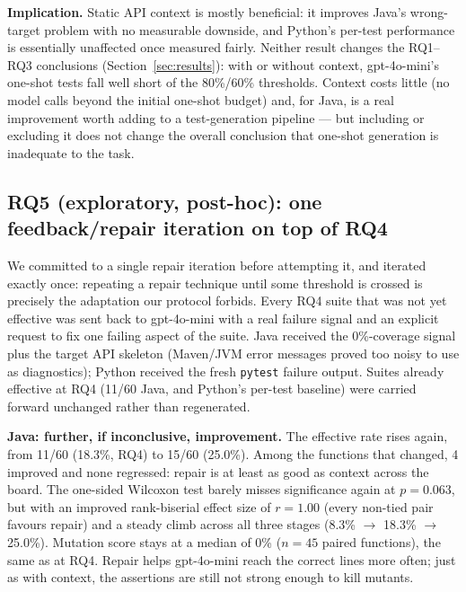 \textbf{Implication.} Static API context is mostly beneficial: it improves Java's
wrong-target problem with no measurable downside, and Python's per-test performance is
essentially unaffected once measured fairly. Neither result changes the RQ1--RQ3
conclusions (Section~\ref{sec:results}): with or without context, gpt-4o-mini's one-shot
tests fall well short of the 80\%/60\% thresholds. Context costs little (no model calls
beyond the initial one-shot budget) and, for Java, is a real improvement worth adding to a
test-generation pipeline --- but including or excluding it does not change the overall
conclusion that one-shot generation is inadequate to the task.

\subsection{RQ5 (exploratory, post-hoc): one feedback/repair iteration on top of RQ4}
\label{sec:rq5}
We committed to a single repair iteration before attempting it, and iterated exactly once:
repeating a repair technique until some threshold is crossed is precisely the adaptation
our protocol forbids. Every RQ4 suite that was not yet effective was sent back to
gpt-4o-mini with a real failure signal and an explicit request to fix one failing aspect
of the suite. Java received the 0\%-coverage signal plus the target API skeleton
(Maven/JVM error messages proved too noisy to use as diagnostics); Python received the
fresh \texttt{pytest} failure output. Suites already effective at RQ4 (11/60 Java, and
Python's per-test baseline) were carried forward unchanged rather than regenerated.

\textbf{Java: further, if inconclusive, improvement.} The effective rate rises again, from
11/60 (18.3\%, RQ4) to 15/60 (25.0\%). Among the functions that changed, 4 improved and
none regressed: repair is at least as good as context across the board. The one-sided
Wilcoxon test barely misses significance again at $p=0.063$, but with an improved
rank-biserial effect size of $r=1.00$ (every non-tied pair favours repair) and a steady
climb across all three stages (8.3\% $\to$ 18.3\% $\to$ 25.0\%). Mutation score stays at a
median of 0\% ($n=45$ paired functions), the same as at RQ4. Repair helps gpt-4o-mini
reach the correct lines more often; just as with context, the assertions are still not
strong enough to kill mutants.

